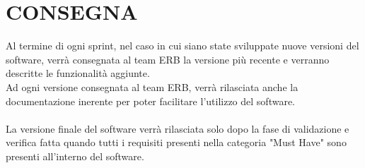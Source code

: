 \documentclass{report}
\begin{document}
\begingroup
\let\clearpage\relax
\chapter{CONSEGNA}
\endgroup

Al termine di ogni sprint, nel caso in cui siano state sviluppate nuove versioni del software, verrà consegnata al team ERB la versione più recente e verranno descritte le funzionalità aggiunte.\\
Ad ogni versione consegnata al team ERB, verrà rilasciata anche la documentazione inerente per poter facilitare l'utilizzo del software.\\\\
La versione finale del software verrà rilasciata solo dopo la fase di validazione e verifica fatta quando tutti i requisiti presenti nella categoria "Must Have" sono presenti all'interno del software.
\end{document}
